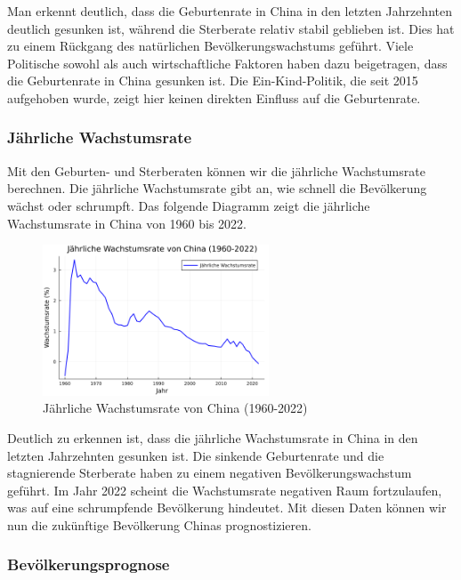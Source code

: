 Man erkennt deutlich, dass die Geburtenrate in China in den letzten Jahrzehnten deutlich gesunken ist, während die Sterberate relativ stabil geblieben ist. Dies hat zu einem Rückgang des natürlichen Bevölkerungswachstums geführt. Viele Politische sowohl als auch wirtschaftliche Faktoren haben dazu beigetragen, dass die Geburtenrate in China gesunken ist. Die Ein-Kind-Politik, die seit 2015 aufgehoben wurde, zeigt hier keinen direkten Einfluss auf die Geburtenrate. 


\subsubsection{Jährliche Wachstumsrate}

Mit den Geburten- und Sterberaten können wir die jährliche Wachstumsrate berechnen. Die jährliche Wachstumsrate gibt an, wie schnell die Bevölkerung wächst oder schrumpft. Das folgende Diagramm zeigt die jährliche Wachstumsrate in China von 1960 bis 2022.

\begin{figure}[H]
    \centering
    \includegraphics[width=0.6\textwidth]{jaehrliche_wachstumsrate_china_1960_2022.png}
    \caption{Jährliche Wachstumsrate von China (1960-2022)}
    \label{fig:jahreswachstumsrate_china}
\end{figure}

Deutlich zu erkennen ist, dass die jährliche Wachstumsrate in China in den letzten Jahrzehnten gesunken ist. Die sinkende Geburtenrate und die stagnierende Sterberate haben zu einem negativen Bevölkerungswachstum geführt. Im Jahr 2022 scheint die Wachstumsrate negativen Raum fortzulaufen, was auf eine schrumpfende Bevölkerung hindeutet. Mit diesen Daten können wir nun die zukünftige Bevölkerung Chinas prognostizieren.

\subsubsection{Bevölkerungsprognose}

